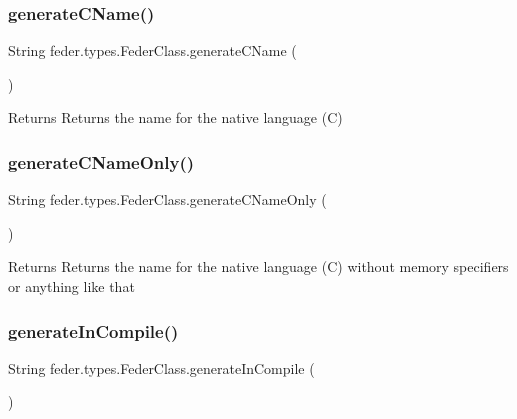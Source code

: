 \subsubsection{\texorpdfstring{generate\+C\+Name()}{generateCName()}}
{\footnotesize\ttfamily String feder.\+types.\+Feder\+Class.\+generate\+C\+Name (\begin{DoxyParamCaption}{ }\end{DoxyParamCaption})}

\begin{DoxyReturn}{Returns}
Returns the name for the native language (C) 
\end{DoxyReturn}
\mbox{\label{classfeder_1_1types_1_1FederClass_a8cdb0ce97458df81ac91636799b5049f}} 
\subsubsection{\texorpdfstring{generate\+C\+Name\+Only()}{generateCNameOnly()}}
{\footnotesize\ttfamily String feder.\+types.\+Feder\+Class.\+generate\+C\+Name\+Only (\begin{DoxyParamCaption}{ }\end{DoxyParamCaption})}

\begin{DoxyReturn}{Returns}
Returns the name for the native language (C) without memory specifiers or anything like that 
\end{DoxyReturn}
\mbox{\label{classfeder_1_1types_1_1FederClass_a4e57f61fe5a5c561e12af11da1e8f37b}} 
\subsubsection{\texorpdfstring{generate\+In\+Compile()}{generateInCompile()}}
{\footnotesize\ttfamily String feder.\+types.\+Feder\+Class.\+generate\+In\+Compile (\begin{DoxyParamCaption}{ }\end{DoxyParamCaption})}

